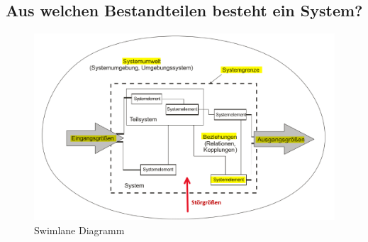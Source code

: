 \subsection{Aus welchen Bestandteilen besteht ein System?}

\begin{figure}[H]
	\centering
	\includegraphics[width=0.7\linewidth]{Bilder/Teil1_zentraleDarstellungSystem.png}
	\caption{Swimlane Diagramm}
\end{figure}

